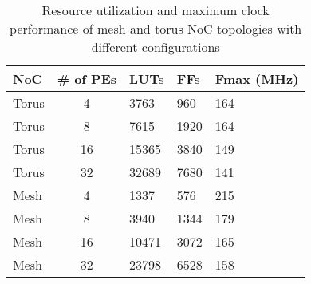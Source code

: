 \begin{table}[!b]
  \centering
  \caption{Resource utilization and maximum clock performance of mesh and torus NoC topologies with different configurations} 
  \begin{tabular}{l|c|l|l|l}
      \toprule
      NoC & \# of PEs & LUTs & FFs & Fmax (MHz) \\
	  \midrule
	  Torus  & 4  & 3763 & 960   & 164\\
	  Torus  & 8  & 7615 & 1920  & 164\\
	  Torus  & 16  & 15365 & 3840 & 149\\
	  Torus  & 32  & 32689 & 7680 & 141\\
	  \midrule
	  Mesh  & 4  & 1337 & 576   & 215\\
	  Mesh  & 8  & 3940 & 1344  & 179\\
	  Mesh  & 16  & 10471 & 3072 & 165\\
	  Mesh  & 32  & 23798 & 6528 & 158\\
      \bottomrule
    \end{tabular}
	\label{table:NocResourceUtilisation}
\end{table}
